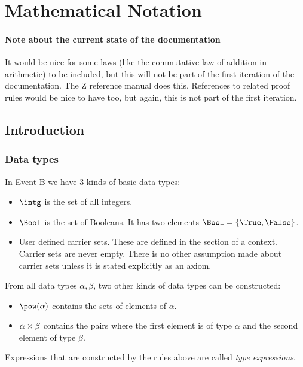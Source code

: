 \section{Mathematical Notation}
\label{mathematical_notation}

\paragraph{Note about the current state of the documentation}
It would be nice for some laws (like the commutative law of addition in arithmetic) to be included, but this will not be part of the first iteration of the documentation. The Z reference manual does this.
References to related proof rules would be nice to have too, but again, this is not part of the first iteration.

\subsection{Introduction}
\label{mathematical_notation_introduction}

\subsubsection{Data types}
\label{data_types}

In Event-B we have 3 kinds of basic data types:
\begin{itemize}
\item {} $\intg$ is the set of all integers.
\item {}
  $\Bool$ is the set of Booleans. 
  It has two elements $\Bool = \{\True,\False\}$.
\item {}
  User defined carrier sets. 
  These are defined in the  section of a context.
  Carrier sets are never empty.
  There is no other assumption made about carrier sets unless it is stated explicitly as
  an axiom.
\end{itemize}
From all data types $\alpha, \beta$, two other kinds of data types can be constructed:
\begin{itemize}
\item $\pow(\alpha)$ contains the sets of elements of $\alpha$.
\item $\alpha\mathbin\times\beta$ contains the pairs where the first element is of type $\alpha$ and the
  second element of type $\beta$.
\end{itemize}
 Expressions that are constructed by the rules above are called \emph{type expressions}.


